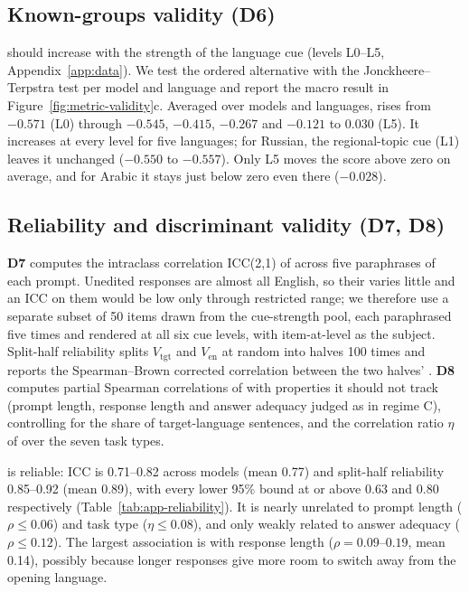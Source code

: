 \FloatBarrier
\subsection{Known-groups validity (D6)}

\dM should increase with the strength of the language cue (levels L0--L5, Appendix~\ref{app:data}). We test the ordered alternative with the Jonckheere--Terpstra test \citep{jonckheere1954distribution} per model and language and report the macro result in Figure~\ref{fig:metric-validity}c. Averaged over models and languages, \dM rises from $-0.571$ (L0) through $-0.545$, $-0.415$, $-0.267$ and $-0.121$ to $0.030$ (L5). It increases at every level for five languages; for Russian, the regional-topic cue (L1) leaves it unchanged ($-0.550$ to $-0.557$). Only L5 moves the score above zero on average, and for Arabic it stays just below zero even there ($-0.028$). 

\FloatBarrier
\subsection{Reliability and discriminant validity (D7, D8)}

\textbf{D7} computes the intraclass correlation ICC(2,1) \citep{shrout1979intraclass} of \dM across five paraphrases of each prompt. Unedited \nocue responses are almost all English, so their \dM varies little and an ICC on them would be low only through restricted range; we therefore use a separate subset of 50 items drawn from the cue-strength pool, each paraphrased five times and rendered at all six cue levels, with item-at-level as the subject. Split-half reliability splits $V_{\mathrm{tgt}}$ and $V_{\mathrm{en}}$ at random into halves 100 times and reports the Spearman--Brown corrected correlation between the two halves' \dM. \textbf{D8} computes partial Spearman correlations of \dM with properties it should not track (prompt length, response length and answer adequacy judged as in regime C), controlling for the share of target-language sentences, and the correlation ratio $\eta$ of \dM over the seven task types.

\dM is reliable: ICC is 0.71--0.82 across models (mean 0.77) and split-half reliability 0.85--0.92 (mean 0.89), with every lower 95\% bound at or above 0.63 and 0.80 respectively (Table~\ref{tab:app-reliability}). It is nearly unrelated to prompt length ($\rho\le0.06$) and task type ($\eta\le0.08$), and only weakly related to answer adequacy ($\rho\le0.12$). The largest association is with response length ($\rho=0.09$--$0.19$, mean 0.14), possibly because longer responses give more room to switch away from the opening language.

